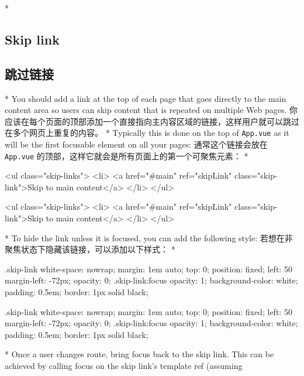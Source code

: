 \begin{paracol}{2} 
 
\switchcolumn[0]*%
\subsection{Skip link}
\switchcolumn
\subsection{跳过链接}
\switchcolumn[0]*%
You should add a link at the top of each page that goes directly to the
main content area so users can skip content that is repeated on multiple
Web pages.
\switchcolumn
你应该在每个页面的顶部添加一个直接指向主内容区域的链接，这样用户就可以跳过在多个网页上重复的内容。
\switchcolumn[0]*%
Typically this is done on the top of \texttt{App.vue} as it will be the
first focusable element on all your pages:
\switchcolumn
通常这个链接会放在 \texttt{App.vue}
的顶部，这样它就会是所有页面上的第一个可聚焦元素：
\switchcolumn[0]*%
\begin{codeHtml}
<ul class="skip-links">
  <li>
    <a href="#main" ref="skipLink" class="skip-link">Skip to main content</a>
  </li>
</ul>
\end{codeHtml}
\switchcolumn
\begin{codeHtml}
<ul class="skip-links">
  <li>
    <a href="#main" ref="skipLink" class="skip-link">Skip to main content</a>
  </li>
</ul>
\end{codeHtml}
\switchcolumn[0]*%
To hide the link unless it is focused, you can add the following style:
\switchcolumn
若想在非聚焦状态下隐藏该链接，可以添加以下样式：
\switchcolumn[0]*%
\begin{codeCss}
.skip-link {
  white-space: nowrap;
  margin: 1em auto;
  top: 0;
  position: fixed;
  left: 50%
  margin-left: -72px;
  opacity: 0;
}
.skip-link:focus {
  opacity: 1;
  background-color: white;
  padding: 0.5em;
  border: 1px solid black;
}
\end{codeCss}
\switchcolumn
\begin{codeCss}
.skip-link {
  white-space: nowrap;
  margin: 1em auto;
  top: 0;
  position: fixed;
  left: 50%
  margin-left: -72px;
  opacity: 0;
}
.skip-link:focus {
  opacity: 1;
  background-color: white;
  padding: 0.5em;
  border: 1px solid black;
}
\end{codeCss}
\switchcolumn[0]*%
Once a user changes route, bring focus back to the skip link. This can
be achieved by calling focus on the skip link's template ref (assuming

\end{paracol}
